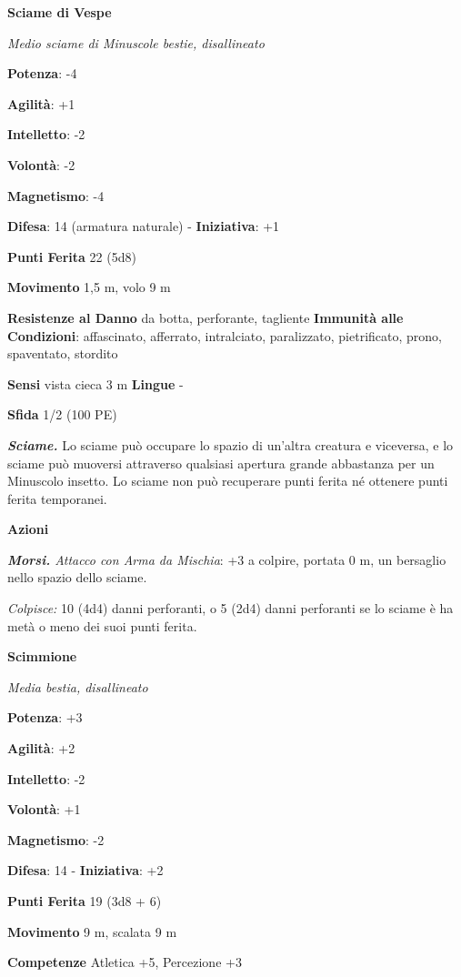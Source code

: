\begin{multicols}{2}
\textbf{Sciame di Vespe}

\emph{Medio sciame di Minuscole bestie, disallineato}

\textbf{Potenza}: -4

\textbf{Agilità}: +1

\textbf{Intelletto}: -2

\textbf{Volontà}: -2

\textbf{Magnetismo}: -4

\textbf{Difesa}: 14 (armatura naturale) - \textbf{Iniziativa}: +1

\textbf{Punti Ferita} 22 (5d8)

\textbf{Movimento} 1,5 m, volo 9 m

\textbf{Resistenze al Danno} da botta, perforante, tagliente
\textbf{Immunità alle Condizioni}: affascinato, afferrato, intralciato,
paralizzato, pietrificato, prono, spaventato, stordito

\textbf{Sensi} vista cieca 3 m \textbf{Lingue} -

\textbf{Sfida} 1/2 (100 PE)\smallskip

\emph{\textbf{Sciame.}} Lo sciame può occupare lo spazio di un'altra
creatura e viceversa, e lo sciame può muoversi attraverso qualsiasi
apertura grande abbastanza per un Minuscolo insetto. Lo sciame non può
recuperare punti ferita né ottenere punti ferita temporanei.

\smallskip\textbf{Azioni}

\emph{\textbf{Morsi.} Attacco con Arma da Mischia}: +3 a colpire,
portata 0 m, un bersaglio nello spazio dello sciame.

\emph{Colpisce:} 10 (4d4) danni perforanti, o 5 (2d4) danni perforanti
se lo sciame è ha metà o meno dei suoi punti ferita.

\textbf{Scimmione}

\emph{Media bestia, disallineato}

\textbf{Potenza}: +3

\textbf{Agilità}: +2

\textbf{Intelletto}: -2

\textbf{Volontà}: +1

\textbf{Magnetismo}: -2

\textbf{Difesa}: 14 - \textbf{Iniziativa}: +2

\textbf{Punti Ferita} 19 (3d8 + 6)

\textbf{Movimento} 9 m, scalata 9 m

\textbf{Competenze} Atletica +5, Percezione +3


\end{multicols}
